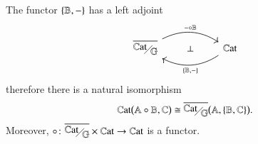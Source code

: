\begin{theorem}\label{theorem:{B,-} has a left adjoint}
    The functor $\{ \mathbb B,-\}$ has a left adjoint
    \[
    \begin{tikzcd}[column sep=2cm,bend angle=30]
    {\WCFover\gcf} \ar[r,bend left,"\ring - \B"{name=A},pos=.493] & \Cat \ar[l,bend left,"\FC \B -"{name=B},pos=.507]	
    \ar[from=A,to=B,phantom,"\bot"]
    \end{tikzcd}
    \]
    therefore there is a natural isomorphism
    \begin{equation}\label{natural isomorphism (A circ B, C) -> (A,{B,C})}
    \Cat \bigl( \ring \A \B , \C \bigr) \cong \WCFover\gcf \bigl( \A, \FC \B \C \bigr).
    \end{equation}
    Moreover, $\ring {} {} \colon \WCFover\gcf \times \Cat \to \Cat$ is a functor.
\end{theorem}
